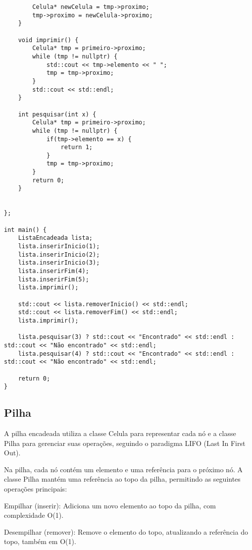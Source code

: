 \documentclass{article}
\begin{document}
\begin{lstlisting}
        Celula* newCelula = tmp->proximo;
        tmp->proximo = newCelula->proximo;
    }

    void imprimir() {
        Celula* tmp = primeiro->proximo;
        while (tmp != nullptr) {
            std::cout << tmp->elemento << " ";
            tmp = tmp->proximo;
        }
        std::cout << std::endl;
    }

    int pesquisar(int x) {
        Celula* tmp = primeiro->proximo;
        while (tmp != nullptr) {
            if(tmp->elemento == x) {
                return 1;
            }
            tmp = tmp->proximo;
        }
        return 0;
    }


};

int main() {
    ListaEncadeada lista;
    lista.inserirInicio(1);
    lista.inserirInicio(2);
    lista.inserirInicio(3);
    lista.inserirFim(4);
    lista.inserirFim(5);
    lista.imprimir();
    
    std::cout << lista.removerInicio() << std::endl;
    std::cout << lista.removerFim() << std::endl;
    lista.imprimir();

    lista.pesquisar(3) ? std::cout << "Encontrado" << std::endl : std::cout << "Não encontrado" << std::endl;
    lista.pesquisar(4) ? std::cout << "Encontrado" << std::endl : std::cout << "Não encontrado" << std::endl;

    return 0;
}
\end{lstlisting}
\subsection{Pilha}
A pilha encadeada utiliza a classe Celula para representar cada nó e a classe Pilha para gerenciar suas operações, seguindo o paradigma LIFO (Last In First Out).

Na pilha, cada nó contém um elemento e uma referência para o próximo nó. A classe Pilha mantém uma referência ao topo da pilha, permitindo as seguintes operações principais:

Empilhar (inserir): Adiciona um novo elemento ao topo da pilha, com complexidade O(1).

Desempilhar (remover): Remove o elemento do topo, atualizando a referência do topo, também em O(1).
\end{document}
